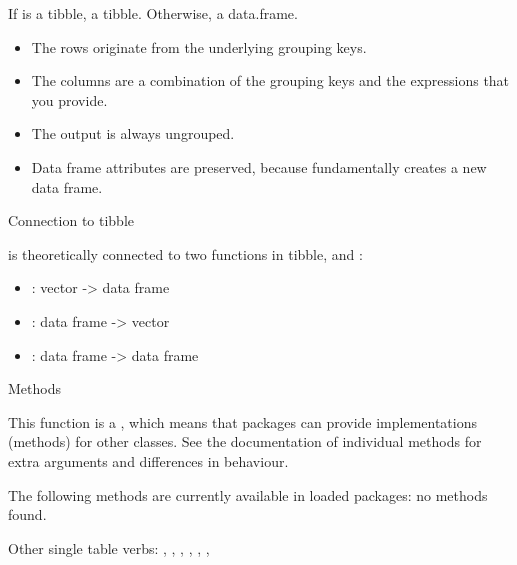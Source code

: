 \documentclass[a4paper]{book}
\begin{document}
%
\begin{Value}
If  is a tibble, a tibble. Otherwise, a data.frame.
\begin{itemize}

\item{} The rows originate from the underlying grouping keys.
\item{} The columns are a combination of the grouping keys and the
expressions that you provide.
\item{} The output is always ungrouped.
\item{} Data frame attributes are  preserved, because 
fundamentally creates a new data frame.

\end{itemize}

\end{Value}
%
\begin{Section}{Connection to tibble}

 is theoretically connected to two functions in tibble,
 and :
\begin{itemize}

\item{} : vector -> data frame
\item{} : data frame -> vector
\item{} : data frame -> data frame

\end{itemize}

\end{Section}
%
\begin{Section}{Methods}

This function is a , which means that packages can provide
implementations (methods) for other classes. See the documentation of
individual methods for extra arguments and differences in behaviour.

The following methods are currently available in loaded packages:
no methods found.
\end{Section}
%
\begin{SeeAlso}
Other single table verbs: 
,
,
,
,
,
,
\end{SeeAlso}
\end{document}
